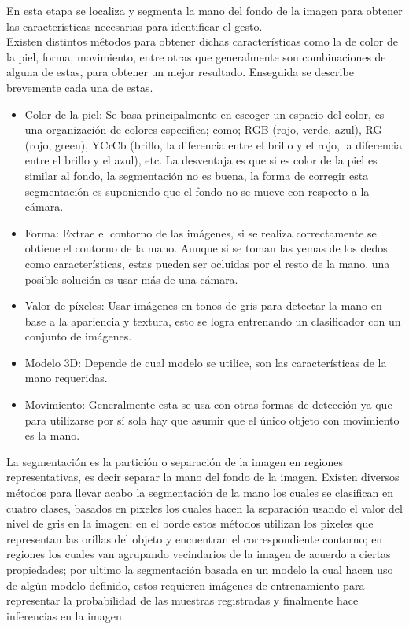 En esta etapa se localiza y segmenta la mano del fondo de la imagen para obtener las características necesarias para identificar el gesto.\\
Existen distintos métodos para obtener dichas características como la de color de la piel, forma, movimiento, entre otras que generalmente son combinaciones de alguna de estas, para obtener un mejor resultado. Enseguida se describe brevemente cada una de estas.  
\begin{itemize}
\item Color de la piel: Se basa principalmente en escoger un espacio del color, es una organización de colores especifica; como; RGB (rojo, verde, azul), RG (rojo, green), YCrCb (brillo, la diferencia entre el brillo y el rojo, la diferencia entre el brillo y el azul), etc. La desventaja es que si es color de la piel es similar al fondo, la segmentación no es buena, la forma de corregir esta segmentación es suponiendo que el fondo no se mueve con respecto a la cámara.
\item Forma: Extrae el contorno de las imágenes, si se realiza correctamente se obtiene el contorno de la mano. Aunque si se toman las yemas de los dedos como características, estas pueden ser ocluidas por el resto de la mano, una posible solución es usar más de una cámara.  
\item Valor de p\'ixeles: Usar imágenes en tonos de gris para detectar la mano en base a la apariencia y textura, esto se logra entrenando un clasificador con un conjunto de imágenes.
\item Modelo 3D: Depende de cual modelo se utilice, son las características de la mano requeridas. 
\item Movimiento: Generalmente esta se usa con otras formas de detección ya que para utilizarse por sí sola hay que asumir que el único objeto con movimiento es la mano.
\end{itemize} 

La segmentación es la partición o separación de la imagen en regiones representativas, es decir separar la mano del fondo de la imagen. Existen diversos métodos para llevar acabo la segmentación de la mano los cuales se clasifican en cuatro clases, basados en pixeles los cuales hacen la separación usando el valor del nivel de gris en la imagen; en el borde estos métodos utilizan los pixeles que representan las orillas del objeto y encuentran el correspondiente contorno; en regiones los cuales van agrupando vecindarios de la imagen de acuerdo a ciertas propiedades; por ultimo la segmentación basada en un modelo la cual hacen uso de algún modelo definido, estos requieren imágenes de entrenamiento para representar la probabilidad de las muestras registradas y finalmente hace inferencias en la imagen.


